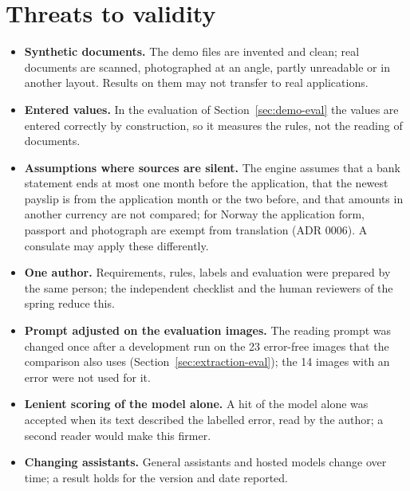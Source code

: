 \section{Threats to validity}
\begin{itemize}
  \item \textbf{Synthetic documents.} The demo files are invented and clean; real documents are
    scanned, photographed at an angle, partly unreadable or in another layout. Results on them may
    not transfer to real applications.
  \item \textbf{Entered values.} In the evaluation of Section~\ref{sec:demo-eval} the values are
    entered correctly by construction, so it measures the rules, not the reading of documents.
  \item \textbf{Assumptions where sources are silent.} The engine assumes that a bank statement
    ends at most one month before the application, that the newest payslip is from the
    application month or the two before, and that amounts in another currency are not compared;
    for Norway the application form, passport and photograph are exempt from translation
    (ADR 0006). A consulate may apply these differently.
  \item \textbf{One author.} Requirements, rules, labels and evaluation were prepared by the same
    person; the independent checklist and the human reviewers of the spring reduce this.
  \item \textbf{Prompt adjusted on the evaluation images.} The reading prompt was changed once
    after a development run on the 23 error-free images that the comparison also uses
    (Section~\ref{sec:extraction-eval}); the 14 images with an error were not used for it.
  \item \textbf{Lenient scoring of the model alone.} A hit of the model alone was accepted when its
    text described the labelled error, read by the author; a second reader would make this firmer.
  \item \textbf{Changing assistants.} General assistants and hosted models change over time; a
    result holds for the version and date reported.
\end{itemize}

